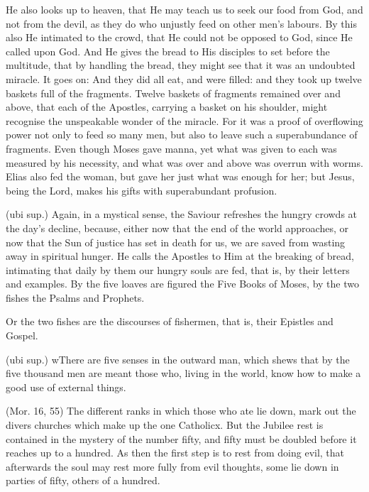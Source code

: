  He also looks up to heaven, that He may teach us to seek our food from God, and not from the devil, as they do who unjustly feed on other men’s labours. By this also He intimated to the crowd, that He could not be opposed to God, since He called upon God. And He gives the bread to His disciples to set before the multitude, that by handling the bread, they might see that it was an undoubted miracle. It goes on: And they did all eat, and were filled: and they took up twelve baskets full of the fragments. Twelve baskets of fragments remained over and above, that each of the Apostles, carrying a basket on his shoulder, might recognise the unspeakable wonder of the miracle. For it was a proof of overflowing power not only to feed so many men, but also to leave such a superabundance of fragments. Even though Moses gave manna, yet what was given to each was measured by his necessity, and what was over and above was overrun with worms. Elias also fed the woman, but gave her just what was enough for her; but Jesus, being the Lord, makes his gifts with superabundant profusion.

 (ubi sup.) Again, in a mystical sense, the Saviour refreshes the hungry crowds at the day’s decline, because, either now that the end of the world approaches, or now that the Sun of justice has set in death for us, we are saved from wasting away in spiritual hunger. He calls the Apostles to Him at the breaking of bread, intimating that daily by them our hungry souls are fed, that is, by their letters and examples. By the five loaves are figured the Five Books of Moses, by the two fishes the Psalms and Prophets.

 Or the two fishes are the discourses of fishermen, that is, their Epistles and Gospel.

 (ubi sup.) wThere are five senses in the outward man, which shews that by the five thousand men are meant those who, living in the world, know how to make a good use of external things.

 (Mor. 16, 55) The different ranks in which those who ate lie down, mark out the divers churches which make up the one Catholicx. But the Jubilee rest is contained in the mystery of the number fifty, and fifty must be doubled before it reaches up to a hundred. As then the first step is to rest from doing evil, that afterwards the soul may rest more fully from evil thoughts, some lie down in parties of fifty, others of a hundred.

